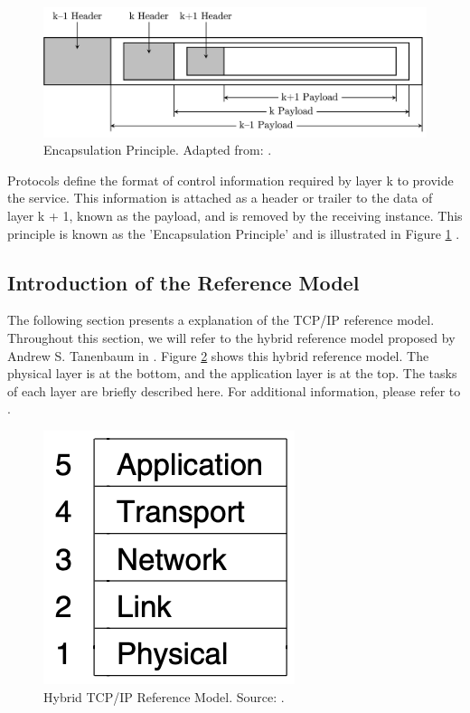 \begin{figure}[h!]
    \centering
    \includegraphics[width=1\linewidth]{figures/tcpip_refmodel/image2.png}
    \caption[Encapsulation Principle]{Encapsulation Principle. Adapted from: \cite{Tanenbaum2010}.}
    \label{fig:EncapsulationPrinciple}
\end{figure}

Protocols define the format of control information required by layer k to provide the service. This information is attached as a header or trailer to the data of layer k + 1, known as the payload, and is removed by the receiving instance. This principle is known as the 'Encapsulation Principle' and is illustrated in Figure \ref{fig:EncapsulationPrinciple} \cite{Tanenbaum2010}.



\subsection{Introduction of the Reference Model}

The following section presents a explanation of the TCP/IP reference model. Throughout this section, we will refer to the hybrid reference model proposed by Andrew S. Tanenbaum in \cite{Tanenbaum2010}. Figure \ref{fig:RefModel} shows this hybrid reference model. The physical layer is at the bottom, and the application layer is at the top. The tasks of each layer are briefly described here. For additional information, please refer to \cite{Tanenbaum2010}.

\begin{figure}[h]
    \centering
    \includegraphics[width=0.25\linewidth]{figures/tcpip_refmodel/image3.png}
    \caption[Hybrid TCP/IP Reference Model]{Hybrid TCP/IP Reference Model. Source: \cite{Tanenbaum2010}.}
    \label{fig:RefModel}
\end{figure}
	
